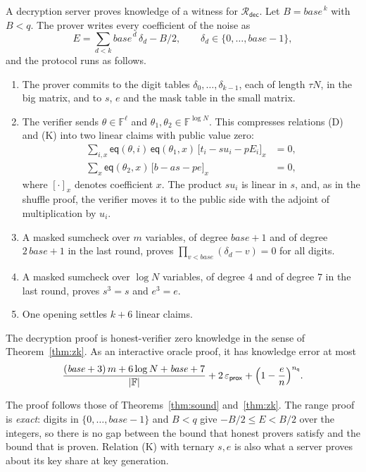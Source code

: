 \documentclass[sigconf,anonymous]{acmart}
\newcommand{\F}{\mathbb{F}}
\newcommand{\eq}{\mathsf{eq}}
\newcommand{\Rdec}{\mathcal{R}_{\mathsf{dec}}}
\newcommand{\epsprox}{\varepsilon_{\mathsf{prox}}}
\newcommand{\nq}{n_{\mathsf{q}}}
\begin{document}
A decryption server proves knowledge of a witness for $\Rdec$. Let $B=\mathit{base}^{\,k}$ with
$B<q$. The prover writes every coefficient of the noise as
\[
  E=\sum_{d<k}\mathit{base}^{\,d}\,\delta_d-B/2,\qquad \delta_d\in\{0,\dots,\mathit{base}-1\},
\]
and the protocol runs as follows.
\begin{enumerate}[leftmargin=1.5em,itemsep=1pt,topsep=3pt]
\item The prover commits to the digit tables $\delta_0,\dots,\delta_{k-1}$, each of length $\tau N$,
  in the big matrix, and to $s$, $e$ and the mask table in the small matrix.
\item The verifier sends $\theta\in\F^{\ell}$ and $\theta_1,\theta_2\in\F^{\log N}$. This compresses
  relations (D) and (K) into two linear claims with public value zero:
  \begin{align*}
    \sum_{i,x}\eq(\theta,i)\,\eq(\theta_1,x)\,\bigl[t_i-su_i-pE_i\bigr]_x&=0,\\
    \sum_{x}\eq(\theta_2,x)\,\bigl[b-as-pe\bigr]_x&=0 ,
  \end{align*}
  where $[\cdot]_x$ denotes coefficient $x$. The product $su_i$ is linear in $s$, and, as in the
  shuffle proof, the verifier moves it to the public side with the adjoint of multiplication by
  $u_i$.
\item A masked sumcheck over $m$ variables, of degree $\mathit{base}+1$ and of degree
  $2\,\mathit{base}+1$ in the last round, proves $\prod_{v<\mathit{base}}(\delta_d-v)=0$ for all
  digits.
\item A masked sumcheck over $\log N$ variables, of degree $4$ and of degree $7$ in the last round,
  proves $s^3=s$ and $e^3=e$.
\item One opening settles $k+6$ linear claims.
\end{enumerate}

\begin{theorem}\label{thm:dec}
The decryption proof is honest-verifier zero knowledge in the sense of Theorem~\ref{thm:zk}. As an
interactive oracle proof, it has knowledge error at most
\[
  \frac{(\mathit{base}+3)\,m+6\log N+\mathit{base}+7}{|\F|}+2\,\epsprox+\Bigl(1-\frac{e}{n}\Bigr)^{\nq}.
\]
\end{theorem}

The proof follows those of Theorems~\ref{thm:sound} and~\ref{thm:zk}. The range proof is
\emph{exact}: digits in $\{0,\dots,\mathit{base}-1\}$ and $B<q$ give $-B/2\le E<B/2$ over the
integers, so there is no gap between the bound that honest provers satisfy and the bound that is
proven. Relation (K) with ternary $s,e$ is also what a server proves about its key share at key
generation.
\end{document}
